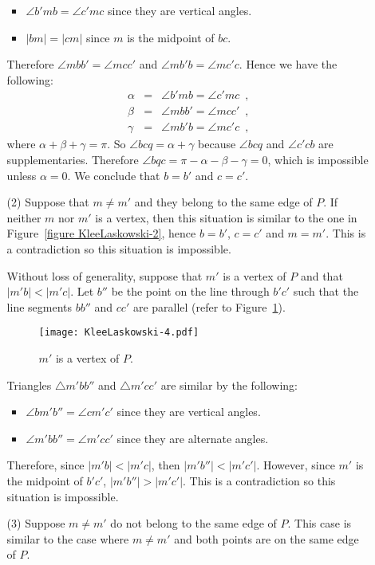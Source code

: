 \documentclass[11pt, oneside]{article}
\begin{document}
\begin{enumerate}
\begin{enumerate}
\begin{itemize}
\item $\angle b'mb = \angle c'mc$ since they are vertical angles.

\item $|bm| = |cm|$ since $m$ is the midpoint of $bc$.
\end{itemize}
Therefore $\angle mbb' = \angle mcc'$
and $\angle mb'b = \angle mc'c$.
Hence we have the following:
\begin{eqnarray*}
\alpha &=& \angle b'mb = \angle c'mc \enspace,\\
\beta &=& \angle mbb' = \angle mcc' \enspace,\\
\gamma &=& \angle mb'b = \angle mc'c \enspace,
\end{eqnarray*}
where $\alpha+\beta+\gamma = \pi$.
So $\angle bcq = \alpha + \gamma$
because $\angle bcq$ and $\angle c'cb$ are supplementaries.
Therefore 
$\angle bqc = \pi - \alpha - \beta - \gamma = 0$,
which is impossible unless $\alpha = 0$.
We conclude that $b=b'$ and $c=c'$.

\item[(2)] Suppose that $m \neq m'$ and they belong to the same edge of $P$.
If neither $m$ nor $m'$ is a vertex,
then this situation is similar to the one in Figure~\ref{figure KleeLaskowski-2},
hence $b=b'$, $c=c'$ and $m=m'$.
This is a contradiction so this situation is impossible.

Without loss of generality,
suppose that $m'$ is a vertex of $P$
and that $|m'b| < |m'c|$.
Let $b''$ be the point on the line through $b'c'$
such that the line segments $bb''$ and $cc'$ are parallel
(refer to Figure~\ref{figure KleeLaskowski-4}).
\begin{figure}
\centering
\texttt{[image: KleeLaskowski-4.pdf]}
\caption{$m'$ is a vertex of $P$.\label{figure KleeLaskowski-4}}
\end{figure}
Triangles $\triangle m'bb''$ and $\triangle m'cc'$ are similar by the following:
\begin{itemize}
\item $\angle bm'b'' = \angle cm'c'$ since they are vertical angles.

\item $\angle m'bb'' = \angle m'cc'$ since they are alternate angles.
\end{itemize}
Therefore,
since $|m'b| < |m'c|$,
then $|m'b''| < |m'c'|$.
However,
since $m'$ is the midpoint of $b'c'$,
$|m'b''| > |m'c'|$.
This is a contradiction so this situation is impossible.

\item[(3)] Suppose $m \neq m'$ do not belong to the same edge of $P$.
This case is similar to the case where
$m \neq m'$ and both points 
are on the same edge of $P$.
\end{enumerate}


\end{enumerate}
\end{document}
